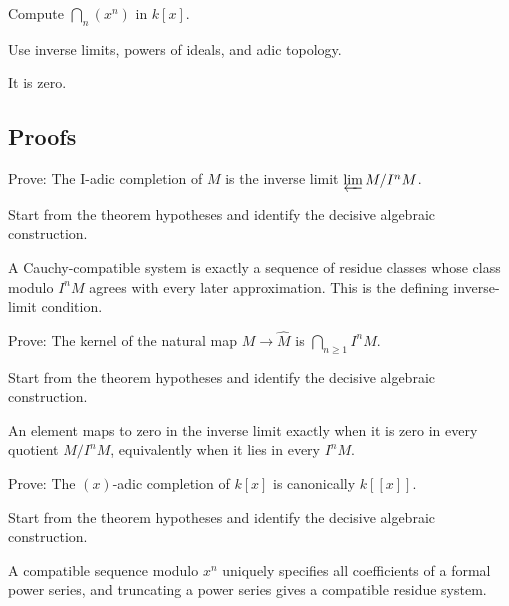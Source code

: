 \begin{exercise}[Intersection]\label{exr:v18-expand-05}
Compute $\bigcap_n(x^n)$ in $k[x]$.
\end{exercise}
\begin{hint}
Use inverse limits, powers of ideals, and adic topology.
\end{hint}
\begin{solution}
It is zero.
\end{solution}

\subsection*{Proofs}

\begin{exercise}\label{exr:v18-expand-06}
Prove: The I-adic completion of $M$ is the inverse limit $\varprojlim M/I^nM$.
\end{exercise}
\begin{hint}
Start from the theorem hypotheses and identify the decisive algebraic construction.
\end{hint}
\begin{solution}
A Cauchy-compatible system is exactly a sequence of residue classes whose class modulo $I^nM$ agrees with every later approximation. This is the defining inverse-limit condition.
\end{solution}

\begin{exercise}\label{exr:v18-expand-07}
Prove: The kernel of the natural map $M\to\widehat M$ is $\bigcap_{n\ge1}I^nM$.
\end{exercise}
\begin{hint}
Start from the theorem hypotheses and identify the decisive algebraic construction.
\end{hint}
\begin{solution}
An element maps to zero in the inverse limit exactly when it is zero in every quotient $M/I^nM$, equivalently when it lies in every $I^nM$.
\end{solution}

\begin{exercise}\label{exr:v18-expand-08}
Prove: The $(x)$-adic completion of $k[x]$ is canonically $k[[x]]$.
\end{exercise}
\begin{hint}
Start from the theorem hypotheses and identify the decisive algebraic construction.
\end{hint}
\begin{solution}
A compatible sequence modulo $x^n$ uniquely specifies all coefficients of a formal power series, and truncating a power series gives a compatible residue system.
\end{solution}

